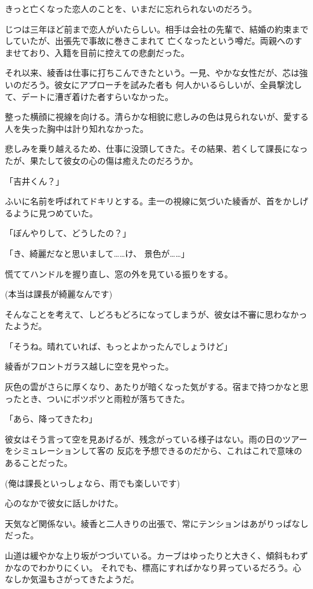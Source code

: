 ﻿\documentclass[
    book,tate,
    line_length=30zw,
    jafontsize=12pt,
    paper=b5j,
    landscape,
    ]{jlreq}
\begin{document}
きっと亡くなった恋人のことを、いまだに忘れられないのだろう。

じつは三年ほど前まで恋人がいたらしい。相手は会社の先輩で、結婚の約束までしていたが、出張先で事故に巻きこまれて
亡くなったという噂だ。両親へのすませており、入籍を目前に控えての悲劇だった。

それ以来、綾香は仕事に打ちこんできたという。一見、やかな女性だが、芯は強いのだろう。彼女にアプローチを試みた者も
何人かいるらしいが、全員撃沈して、デートに漕ぎ着けた者すらいなかった。

整った横顔に視線を向ける。清らかな相貌に悲しみの色は見られないが、愛する人を失った胸中は計り知れなかった。

悲しみを乗り越えるため、仕事に没頭してきた。その結果、若くして課長になったが、果たして彼女の心の傷は癒えたのだろうか。

「吉井くん？」

ふいに名前を呼ばれてドキリとする。圭一の視線に気づいた綾香が、首をかしげるように見つめていた。

「ぼんやりして、どうしたの？」

「き、綺麗だなと思いまして……け、 景色が……」

慌ててハンドルを握り直し、窓の外を見ている振りをする。

(本当は課長が綺麗なんです)

そんなことを考えて、しどろもどろになってしまうが、彼女は不審に思わなかったようだ。

「そうね。晴れていれば、もっとよかったんでしょうけど」

綾香がフロントガラス越しに空を見やった。

灰色の雲がさらに厚くなり、あたりが暗くなった気がする。宿まで持つかなと思ったとき、ついにポツポツと雨粒が落ちてきた。

「あら、降ってきたわ」

彼女はそう言って空を見あげるが、残念がっている様子はない。雨の日のツアーをシミュレーションして客の
反応を予想できるのだから、これはこれで意味のあることだった。

(俺は課長といっしょなら、雨でも楽しいです)

心のなかで彼女に話しかけた。

天気など関係ない。綾香と二人きりの出張で、常にテンションはあがりっぱなしだった。

山道は緩やかな上り坂がつづいている。カーブはゆったりと大きく、傾斜もわずかなのでわかりにくい。
それでも、標高にすればかなり昇っているだろう。心なしか気温もさがってきたようだ。
\end{document}
